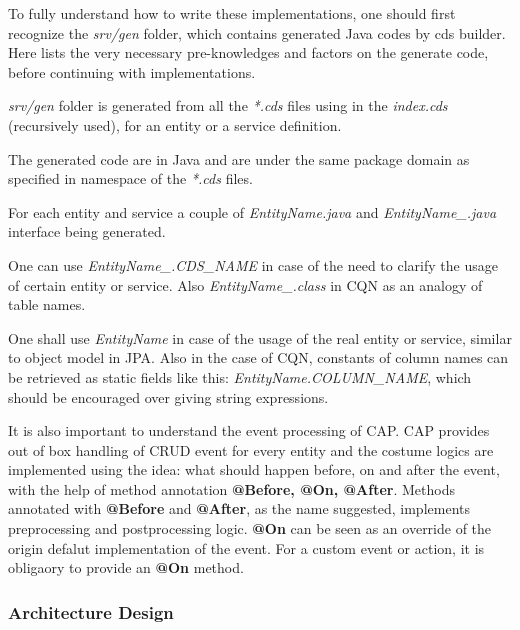 \bigskip
To fully understand how to write these implementations, one should first recognize the \textit{srv/gen} folder, which contains generated Java codes by cds builder. Here lists the very necessary pre-knowledges and factors on the generate code, before continuing with implementations. 
\begin{compactenum}
	\item \textit{srv/gen} folder is generated from all the \textit{*.cds} files using in the \textit{index.cds} (recursively used), for an entity or a service definition.
    \item The generated code are in Java and are under the same package domain as specified in namespace of the \textit{*.cds} files.
    \item For each entity and service a couple of \textit{EntityName.java} and \textit{EntityName\_.java} interface being generated. 
    \item One can use \textit{EntityName\_.CDS\_NAME} in case of the need to clarify the usage of certain entity or service. Also \textit{EntityName\_.class} in CQN as an analogy of table names. 
    \item One shall use \textit{EntityName} in case of the usage of the real entity or service, similar to object model in JPA. Also in the case of CQN, constants of column names can be retrieved as static fields like this: \textit{EntityName.COLUMN\_NAME}, which should be encouraged over giving string expressions.
\end{compactenum}

\bigskip
It is also important to understand the event processing of CAP. CAP provides out of box handling of CRUD event for every entity and the costume logics are implemented using the idea: what should happen before, on and after the event, with the help of method annotation \textbf{@Before, @On, @After}. Methods annotated with \textbf{@Before} and \textbf{@After}, as the name suggested, implements preprocessing and postprocessing logic. \textbf{@On} can be seen as an override of the origin defalut implementation of the event. For a custom event or action, it is obligaory to provide an \textbf{@On} method.

\subsubsection{Architecture Design}
\label{subsubsec:D-srv-design}

